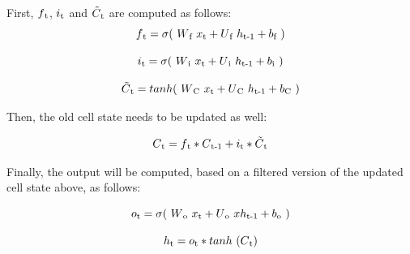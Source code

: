     First, $f\textsubscript{t}$, $ i\textsubscript{t}$ and $ \Tilde{C}\textsubscript{t}$  are computed as follows:
    \begin{equation} \label{eq:f}
        f\textsubscript{t} = \sigma(\ W\textsubscript{f}\ x\textsubscript{t} + U\textsubscript{f}\ h\textsubscript{t-1} +  b\textsubscript{f}\ )
    \end{equation}
    
    \begin{equation} \label{eq:i}
        i\textsubscript{t} = \sigma(\ W\textsubscript{i}\ x\textsubscript{t} + U\textsubscript{i}\ h\textsubscript{t-1} +  b\textsubscript{i}\ )
    \end{equation}

    \begin{equation} \label{eq:cellUpdate}
        \Tilde{C}\textsubscript{t} = tanh(\ W\textsubscript{C}\ x\textsubscript{t} + U\textsubscript{C}\ h\textsubscript{t-1} +  b\textsubscript{C}\ )
    \end{equation}

    Then, the old cell state needs to be updated as well:
    
    \begin{equation} \label{eq:cellState}
        C\textsubscript{t} = f\textsubscript{t} * C\textsubscript{t-1} + i\textsubscript{t} * \Tilde{C}\textsubscript{t}
    \end{equation}

    Finally, the output will be computed, based on a filtered version of the updated cell state above, as follows:

     \begin{equation}
        o\textsubscript{t} = \sigma(\ W\textsubscript{o}\ x\textsubscript{t} + U\textsubscript{o}\ xh\textsubscript{t-1} +  b\textsubscript{o}\ )
    \end{equation}
    
    \begin{equation}
        h\textsubscript{t} = o\textsubscript{t} * tanh\ (C\textsubscript{t})
    \end{equation}
    
    
